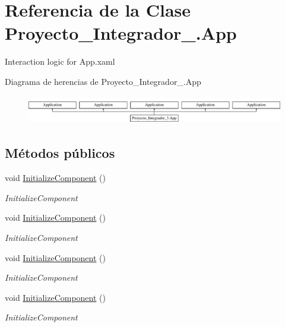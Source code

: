 \hypertarget{class_proyecto___integrador__3_1_1_app}{\section{Referencia de la Clase Proyecto\-\_\-\-Integrador\-\_.\-App}
\label{class_proyecto___integrador__3_1_1_app}
}


Interaction logic for App.\-xaml  


Diagrama de herencias de Proyecto\-\_\-\-Integrador\-\_.\-App\begin{figure}[H]
\begin{center}
\leavevmode
\includegraphics[height=1.265537cm]{class_proyecto___integrador__3_1_1_app}
\end{center}
\end{figure}
\subsection*{Métodos públicos}
\begin{DoxyCompactItemize}
\item 
void \hyperlink{class_proyecto___integrador__3_1_1_app_a643a6ed9d7f0be6f862cd033ec749ec0}{Initialize\-Component} ()
\begin{DoxyCompactList}\small\item\em Initialize\-Component \end{DoxyCompactList}\item 
void \hyperlink{class_proyecto___integrador__3_1_1_app_a643a6ed9d7f0be6f862cd033ec749ec0}{Initialize\-Component} ()
\begin{DoxyCompactList}\small\item\em Initialize\-Component \end{DoxyCompactList}\item 
void \hyperlink{class_proyecto___integrador__3_1_1_app_a643a6ed9d7f0be6f862cd033ec749ec0}{Initialize\-Component} ()
\begin{DoxyCompactList}\small\item\em Initialize\-Component \end{DoxyCompactList}\item 
void \hyperlink{class_proyecto___integrador__3_1_1_app_a643a6ed9d7f0be6f862cd033ec749ec0}{Initialize\-Component} ()
\begin{DoxyCompactList}\small\item\em Initialize\-Component \end{DoxyCompactList}\end{DoxyCompactItemize}
